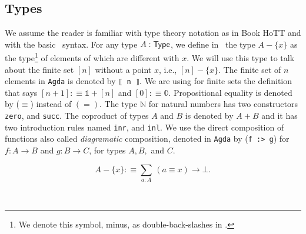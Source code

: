 \documentclass[11pt, a4paper, oneside]{amsart}
\begin{document}
\subsection{Types}

We assume the reader is familiar with type theory notation as in Book
HoTT \cite{hottbook} and with the basic \Agda\, syntax. For any type
$A : \mathsf{Type}$, we define in~ the type $A - \{x\}$ as the
type\footnote{We denote this symbol, minus, as  double-back-slashes in
\Agda.} of elements of which are different with $x$. We will use this
type to talk about the finite set $[n]$ without a point $x$, i.e.,
$[n] - \{ x\}$. The finite set of $n$ elements in \texttt{Agda} is
denoted by \texttt{⟦ n ⟧}. We are using for finite sets the definition
that says $[n + 1] :\equiv 𝟙 + [n]$ and $[0] :\equiv 𝟘$.
Propositional equality is denoted by ($\equiv$) instead of $(=)$. The
type $ℕ$ for natural numbers has two constructors \texttt{zero}, and
\texttt{succ}. The coproduct of types $A$ and $B$ is denoted by $A+B$
and it has two introduction rules named \texttt{inr}, and
\texttt{inl}. We use the direct composition of functions also called
\emph{diagramatic} composition, denoted in \texttt{Agda} by (\texttt{f
:> g}) for $f : A \to B$ and $g : B \to C$, for types $A,B,$ and $C$.

\begin{equation}\label{eq:minus}
A - \{x\} :\equiv \sum_{a : A} \, (a ≡ x) → \bot.
\end{equation}

\begin{code}[hide]%
%
\>[2]%
\>[7]\AgdaSymbol{:}\AgdaSpace{}%
\AgdaSpace{}%
\AgdaSymbol{\{}\AgdaSpace{}%
\AgdaSymbol{:}\AgdaSpace{}%
\AgdaSymbol{\}}\AgdaSpace{}%
\AgdaSpace{}%
\AgdaSymbol{(}\AgdaSpace{}%
\AgdaSymbol{:}\AgdaSpace{}%
\AgdaSpace{}%
\AgdaSymbol{)}\AgdaSpace{}%
\AgdaSymbol{(}\AgdaSpace{}%
\AgdaSymbol{:}\AgdaSpace{}%
\AgdaSymbol{)}\AgdaSpace{}%
\AgdaSpace{}%
\AgdaSpace{}%
\<%
\\
%
\>[2]%
\>[7]\AgdaSymbol{\{}\AgdaSymbol{\}}\AgdaSpace{}%
\AgdaSpace{}%
%
\>[16]\AgdaSymbol{=}\AgdaSpace{}%
\AgdaSpace{}%
\AgdaSpace{}%
\AgdaSpace{}%
\AgdaSpace{}%
\AgdaSpace{}%
\AgdaSymbol{((}\AgdaSpace{}%
\AgdaSpace{}%
\AgdaSymbol{)}\AgdaSpace{}%
\AgdaSpace{}%
\AgdaSpace{}%
\AgdaSymbol{))}\<%
\end{code}
\end{document}
